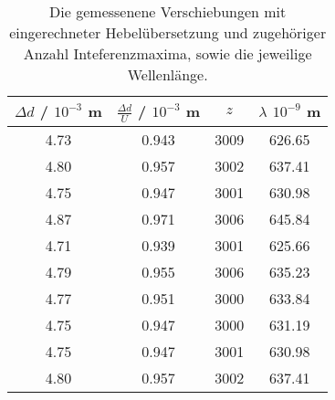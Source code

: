 \begin{table}[!htp]
\centering
\caption{Die gemessenene Verschiebungen mit eingerechneter Hebelübersetzung und zugehöriger Anzahl Inteferenzmaxima, sowie die jeweilige Wellenlänge.}
\label{tab:messung1}
\begin{tabular}{c c c c}
\toprule
{$\Delta d$ / $10^{-3}$ m} & {$\frac{\Delta d} {U} $ / $10^{-3}$ m} & {$z$} & {$\lambda$ $10^{-9}$ m} \\
\midrule
4.73 & 0.943 & 3009 & 626.65 \\
4.80 & 0.957 & 3002 & 637.41 \\
4.75 & 0.947 & 3001 & 630.98 \\
4.87 & 0.971 & 3006 & 645.84 \\
4.71 & 0.939 & 3001 & 625.66 \\
4.79 & 0.955 & 3006 & 635.23 \\
4.77 & 0.951 & 3000 & 633.84 \\
4.75 & 0.947 & 3000 & 631.19 \\
4.75 & 0.947 & 3001 & 630.98 \\
4.80 & 0.957 & 3002 & 637.41 \\
\bottomrule
\end{tabular}
\end{table}